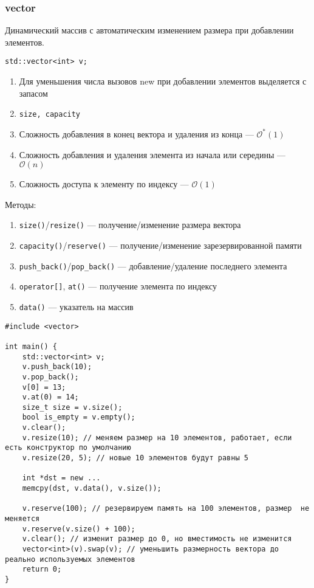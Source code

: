 \subsubsection{vector}
Динамический массив с автоматическим изменением размера при добавлении элементов.
\begin{verbatim}
std::vector<int> v;
\end{verbatim}
\begin{enumerate}[noitemsep]
    \item Для уменьшения числа вызовов new при добавлении элементов выделяется с запасом
	\item \texttt{size, capacity}
	\item Сложность добавления в конец вектора и удаления из конца --- $ \mathcal{O}^{*}(1)$ 
	\item Сложность добавления и удаления элемента из начала или середины --- $ \mathcal{O}(n)$
	\item Сложность доступа к элементу по индексу --- $ \mathcal{O}(1)$
\end{enumerate} 
Методы:
\begin{enumerate}[noitemsep]
	\item \texttt{size()}/\texttt{resize()} --- получение/изменение размера вектора
	\item \texttt{capacity()}/\texttt{reserve()} --- получение/изменение зарезервированной памяти
	\item \texttt{push\_back()}/\texttt{pop\_back()} --- добавление/удаление последнего элемента
	\item 
		\texttt{operator[]}, \texttt{at()} --- получение элемента по индексу
	\item \texttt{data()} --- указатель на массив
\end{enumerate} 

\begin{verbatim}
#include <vector>

int main() {
	std::vector<int> v;
	v.push_back(10);
	v.pop_back();
	v[0] = 13;
	v.at(0) = 14;
	size_t size = v.size();
	bool is_empty = v.empty();
	v.clear();
	v.resize(10); // меняем размер на 10 элементов, работает, если есть конструктор по умолчанию
	v.resize(20, 5); // новые 10 элементов будут равны 5

	int *dst = new ...
	memcpy(dst, v.data(), v.size());

	v.reserve(100); // резервируем память на 100 элементов, размер  не меняется
	v.reserve(v.size() + 100);
	v.clear(); // изменит размер до 0, но вместимость не изменится
	vector<int>(v).swap(v); // уменьшить размерность вектора до реально используемых элементов
	return 0;
}
\end{verbatim}
